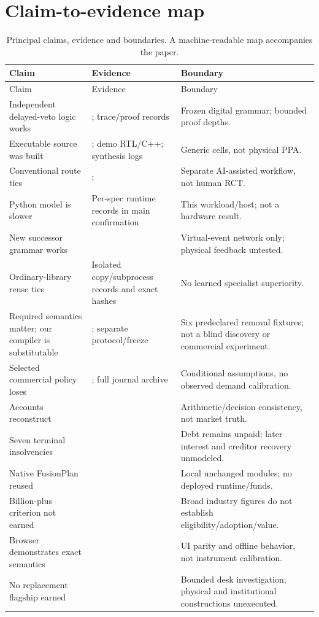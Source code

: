 \section{Claim-to-evidence map}
\begin{longtable}{L{0.28\textwidth}L{0.34\textwidth}L{0.29\textwidth}}
\caption{Principal claims, evidence and boundaries. A machine-readable map accompanies the paper.}\\
\toprule Claim & Evidence & Boundary\\
\midrule\endfirsthead
\toprule Claim & Evidence & Boundary\\\midrule\endhead
Independent delayed-veto logic works & ; trace/proof records & Frozen digital grammar; bounded proof depths.\\
Executable source was built & ; demo RTL/C++; synthesis logs & Generic cells, not physical PPA.\\
Conventional route ties & ;  & Separate AI-assisted workflow, not human RCT.\\
Python model is slower & Per-spec runtime records in main confirmation & This workload/host; not a hardware result.\\
New successor grammar works &  & Virtual-event network only; physical feedback untested.\\
Ordinary-library reuse ties & Isolated copy/subprocess records and exact hashes & No learned specialist superiority.\\
Required semantics matter; our compiler is substitutable & ; separate protocol/freeze & Six predeclared removal fixtures; not a blind discovery or commercial experiment.\\
Selected commercial policy loses & ; full journal archive & Conditional assumptions, no observed demand calibration.\\
Accounts reconstruct &  & Arithmetic/decision consistency, not market truth.\\
Seven terminal insolvencies &  & Debt remains unpaid; later interest and creditor recovery unmodeled.\\
Native FusionPlan reused &  & Local unchanged modules; no deployed runtime/funds.\\
Billion-plus criterion not earned &  & Broad industry figures do not establish eligibility/adoption/value.\\
Browser demonstrates exact semantics &  & UI parity and offline behavior, not instrument calibration.\\
No replacement flagship earned &  & Bounded desk investigation; physical and institutional constructions unexecuted.\\
\bottomrule
\end{longtable}

